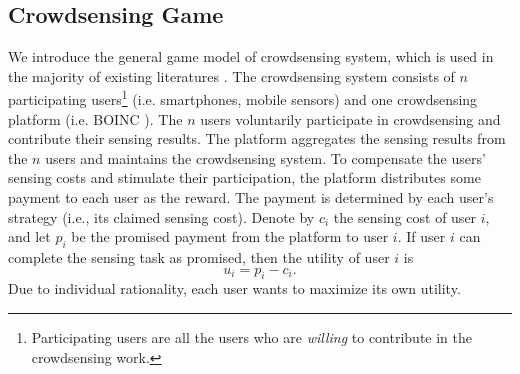 \documentclass[conference]{IEEEtran}
\theoremstyle{definition}
\begin{document}
\subsection{Crowdsensing Game}
\label{subsec:CG}
{
We introduce the general game model of crowdsensing system, which is used in the majority of existing literatures \cite{yang2012crowdsourcing,koutsopoulos2013optimal,luo2014profit,zhang2014free,liu2014social,yan2015ifc}. The crowdsensing system consists of $n$ participating users\footnote{Participating users are all the users who are \emph{willing} to contribute in the crowdsensing work.} (i.e. smartphones, mobile sensors) and one crowdsensing platform (i.e. BOINC \cite{anderson2004boinc}). The $n$ users voluntarily participate in crowdsensing and contribute their sensing results. The platform aggregates the sensing results from the $n$ users and maintains the crowdsensing system. %
To compensate the users' sensing costs and stimulate their participation, the platform distributes some payment to each user as the reward. The payment is determined by each user's strategy (i.e., its claimed sensing cost). Denote by $c_i$ the sensing cost of user $i$, and let $p_i$ be the promised payment from the platform to user $i$. If user $i$ can complete the sensing task as promised, then the utility of user $i$ is
\begin{equation}
\label{eqn:user_utility_1}
u_i = p_i-c_i.
\end{equation}
Due to individual rationality, each user wants to maximize its own utility. %

}
\end{document}
